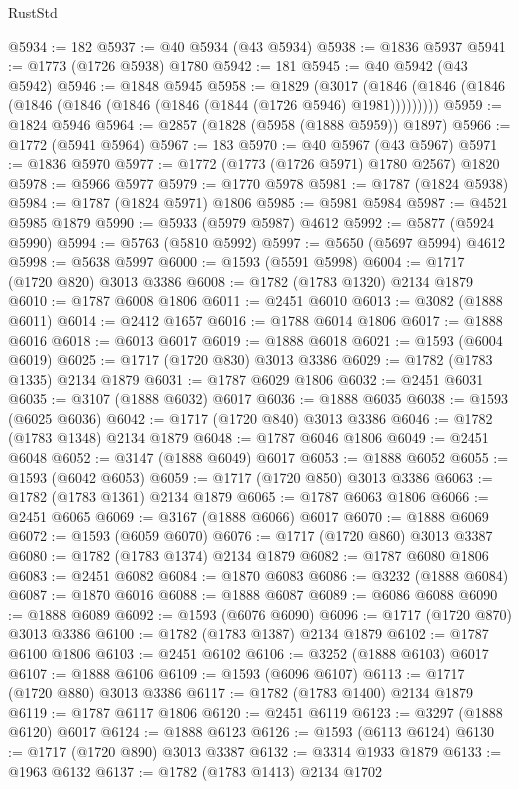 \begin{lexlean}{RustStd}
\begin{coremodule}
@5934 := 182
@5937 := @40 @5934 (@43 @5934)
@5938 := @1836 @5937
@5941 := @1773 (@1726 @5938) @1780
@5942 := 181
@5945 := @40 @5942 (@43 @5942)
@5946 := @1848 @5945
@5958 := @1829
    (@3017 (@1846 (@1846 (@1846 (@1846 (@1846 (@1846 (@1846 (@1844 (@1726 @5946) @1981)))))))))
@5959 := @1824 @5946
@5964 := @2857 (@1828 (@5958 (@1888 @5959)) @1897)
@5966 := @1772 (@5941 @5964)
@5967 := 183
@5970 := @40 @5967 (@43 @5967)
@5971 := @1836 @5970
@5977 := @1772 (@1773 (@1726 @5971) @1780 @2567) @1820
@5978 := @5966 @5977
@5979 := @1770 @5978
@5981 := @1787 (@1824 @5938)
@5984 := @1787 (@1824 @5971) @1806
@5985 := @5981 @5984
@5987 := @4521 @5985 @1879
@5990 := @5933 (@5979 @5987) @4612
@5992 := @5877 (@5924 @5990)
@5994 := @5763 (@5810 @5992)
@5997 := @5650 (@5697 @5994) @4612
@5998 := @5638 @5997
@6000 := @1593 (@5591 @5998)
@6004 := @1717 (@1720 @820) @3013 @3386
@6008 := @1782 (@1783 @1320) @2134 @1879
@6010 := @1787 @6008 @1806
@6011 := @2451 @6010
@6013 := @3082 (@1888 @6011)
@6014 := @2412 @1657
@6016 := @1788 @6014 @1806
@6017 := @1888 @6016
@6018 := @6013 @6017
@6019 := @1888 @6018
@6021 := @1593 (@6004 @6019)
@6025 := @1717 (@1720 @830) @3013 @3386
@6029 := @1782 (@1783 @1335) @2134 @1879
@6031 := @1787 @6029 @1806
@6032 := @2451 @6031
@6035 := @3107 (@1888 @6032) @6017
@6036 := @1888 @6035
@6038 := @1593 (@6025 @6036)
@6042 := @1717 (@1720 @840) @3013 @3386
@6046 := @1782 (@1783 @1348) @2134 @1879
@6048 := @1787 @6046 @1806
@6049 := @2451 @6048
@6052 := @3147 (@1888 @6049) @6017
@6053 := @1888 @6052
@6055 := @1593 (@6042 @6053)
@6059 := @1717 (@1720 @850) @3013 @3386
@6063 := @1782 (@1783 @1361) @2134 @1879
@6065 := @1787 @6063 @1806
@6066 := @2451 @6065
@6069 := @3167 (@1888 @6066) @6017
@6070 := @1888 @6069
@6072 := @1593 (@6059 @6070)
@6076 := @1717 (@1720 @860) @3013 @3387
@6080 := @1782 (@1783 @1374) @2134 @1879
@6082 := @1787 @6080 @1806
@6083 := @2451 @6082
@6084 := @1870 @6083
@6086 := @3232 (@1888 @6084)
@6087 := @1870 @6016
@6088 := @1888 @6087
@6089 := @6086 @6088
@6090 := @1888 @6089
@6092 := @1593 (@6076 @6090)
@6096 := @1717 (@1720 @870) @3013 @3386
@6100 := @1782 (@1783 @1387) @2134 @1879
@6102 := @1787 @6100 @1806
@6103 := @2451 @6102
@6106 := @3252 (@1888 @6103) @6017
@6107 := @1888 @6106
@6109 := @1593 (@6096 @6107)
@6113 := @1717 (@1720 @880) @3013 @3386
@6117 := @1782 (@1783 @1400) @2134 @1879
@6119 := @1787 @6117 @1806
@6120 := @2451 @6119
@6123 := @3297 (@1888 @6120) @6017
@6124 := @1888 @6123
@6126 := @1593 (@6113 @6124)
@6130 := @1717 (@1720 @890) @3013 @3387
@6132 := @3314 @1933 @1879
@6133 := @1963 @6132
@6137 := @1782 (@1783 @1413) @2134 @1702

\end{coremodule}
\end{lexlean}
